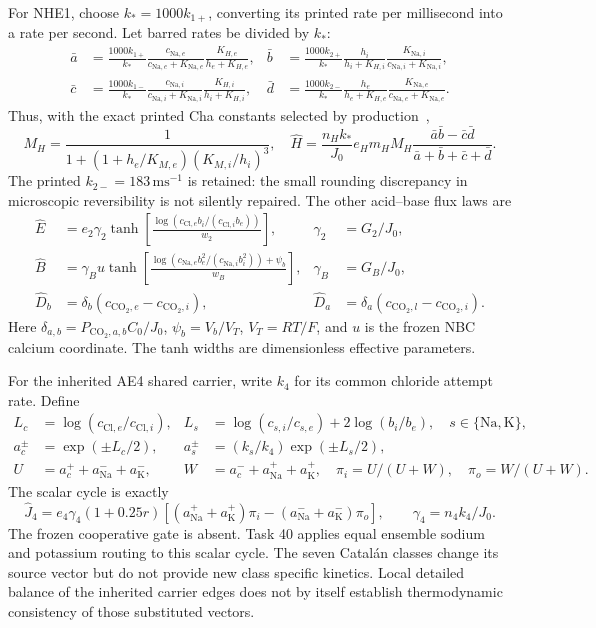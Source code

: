 For NHE1, choose $k_*=1000k_{1+}$, converting its printed rate per
millisecond into a rate per second.  Let barred rates be divided by $k_*$:
\begin{align*}
 \bar a&=\frac{1000k_{1+}}{k_*}
       \frac{c_{\mathrm{Na},e}}{c_{\mathrm{Na},e}+K_{\mathrm{Na},e}}
       \frac{K_{H,e}}{h_e+K_{H,e}},&
 \bar b&=\frac{1000k_{2+}}{k_*}
       \frac{h_i}{h_i+K_{H,i}}
       \frac{K_{\mathrm{Na},i}}{c_{\mathrm{Na},i}+K_{\mathrm{Na},i}},\\
 \bar c&=\frac{1000k_{1-}}{k_*}
       \frac{c_{\mathrm{Na},i}}{c_{\mathrm{Na},i}+K_{\mathrm{Na},i}}
       \frac{K_{H,i}}{h_i+K_{H,i}},&
 \bar d&=\frac{1000k_{2-}}{k_*}
       \frac{h_e}{h_e+K_{H,e}}
       \frac{K_{\mathrm{Na},e}}{c_{\mathrm{Na},e}+K_{\mathrm{Na},e}}.
\end{align*}
Thus, with the exact printed Cha constants selected by production~\cite{Cha2009},
\[
 M_H=\frac{1}{1+(1+h_e/K_{M,e})(K_{M,i}/h_i)^3},\quad
 \widehat H=\frac{n_Hk_*}{J_0}e_Hm_HM_H
        \frac{\bar a\bar b-\bar c\bar d}{\bar a+\bar b+\bar c+\bar d}.
\]
The printed $k_{2-}=183\,\mathrm{ms}^{-1}$ is retained: the small
rounding discrepancy in microscopic reversibility is not silently repaired.
The other acid--base flux laws are
\begin{align*}
 \widehat E&=e_2\gamma_2\tanh\left[
  \frac{\log(c_{\mathrm{Cl},e}b_i/(c_{\mathrm{Cl},i}b_e))}{w_2}\right],
 &\gamma_2&=G_2/J_0,\\
 \widehat B&=\gamma_Bu\tanh\left[
  \frac{\log(c_{\mathrm{Na},e}b_e^2/(c_{\mathrm{Na},i}b_i^2))+\psi_b}{w_B}\right],
 &\gamma_B&=G_B/J_0,\\
 \widehat D_b&=\delta_b(c_{\mathrm{CO}_2,e}-c_{\mathrm{CO}_2,i}),
 &\widehat D_a&=\delta_a(c_{\mathrm{CO}_2,l}-c_{\mathrm{CO}_2,i}).
\end{align*}
Here $\delta_{a,b}=P_{\mathrm{CO}_2,a,b}C_0/J_0$,
$\psi_b=V_b/V_T$, $V_T=RT/F$, and $u$ is the frozen NBC calcium
coordinate.  The tanh widths are dimensionless effective parameters.

For the inherited AE4 shared carrier, write $k_4$ for its common chloride
attempt rate.  Define
\begin{align*}
 L_c&=\log(c_{\mathrm{Cl},e}/c_{\mathrm{Cl},i}),&
 L_s&=\log(c_{s,i}/c_{s,e})+2\log(b_i/b_e),\quad s\in\{\mathrm{Na},\mathrm K\},\\
 a_c^\pm&=\exp(\pm L_c/2),&
 a_s^\pm&=(k_s/k_4)\exp(\pm L_s/2),\\
 U&=a_c^++a_{\mathrm{Na}}^-+a_{\mathrm K}^-,&
 W&=a_c^-+a_{\mathrm{Na}}^++a_{\mathrm K}^+,\quad
 \pi_i=U/(U+W),\quad\pi_o=W/(U+W).
\end{align*}
The scalar cycle is exactly
\[
 \widehat J_4=e_4\gamma_4(1+0.25r)
 \left[(a_{\mathrm{Na}}^++a_{\mathrm K}^+)\pi_i
       -(a_{\mathrm{Na}}^-+a_{\mathrm K}^-)\pi_o\right],
 \qquad\gamma_4=n_4k_4/J_0.
\]
The frozen cooperative gate is absent.  Task 40 applies equal ensemble
sodium and potassium routing to this scalar cycle.  The seven Catal\'an
classes change its source vector but do not provide new class specific
kinetics.  Local detailed balance of the inherited carrier edges does not
by itself establish thermodynamic consistency of those substituted vectors.

